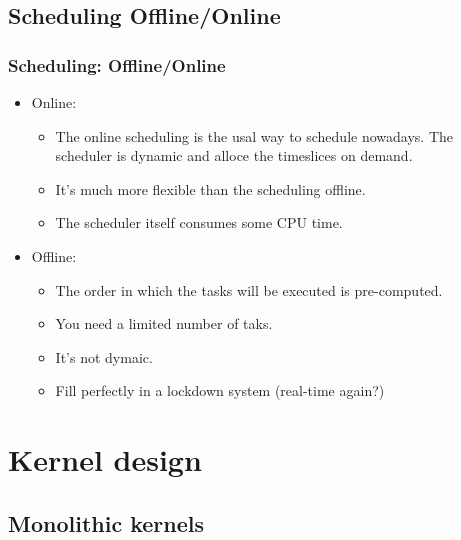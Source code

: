 \subsection{Scheduling Offline/Online}
\begin{frame}
  \frametitle{Scheduling: Offline/Online}
        \begin{itemize}
        \item Online:
        \begin{itemize}
                \item The online scheduling is the usal way to schedule
                nowadays. The scheduler is dynamic and alloce the
                timeslices on demand.
                \item It's much more flexible than the scheduling
                offline.
                \item The scheduler itself consumes some CPU time.
        \end{itemize}
        \item Offline:
        \begin{itemize}
                \item The order in which the tasks will be executed is
                pre-computed.
                \item You need a limited number of taks.
                \item It's not dymaic.
                \item Fill perfectly in a lockdown system (real-time
                again?)
        \end{itemize}
        \end{itemize}
\end{frame}

%
%

\section{Kernel design}
\subsection{Monolithic kernels}

%
%

